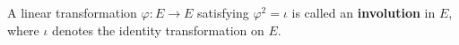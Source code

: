 A linear transformation $\varphi: E \rightarrow E$ satisfying $\varphi^2 = \iota$ is called an \textbf{involution} in $E$, where $\iota$ denotes the identity transformation on $E$.
